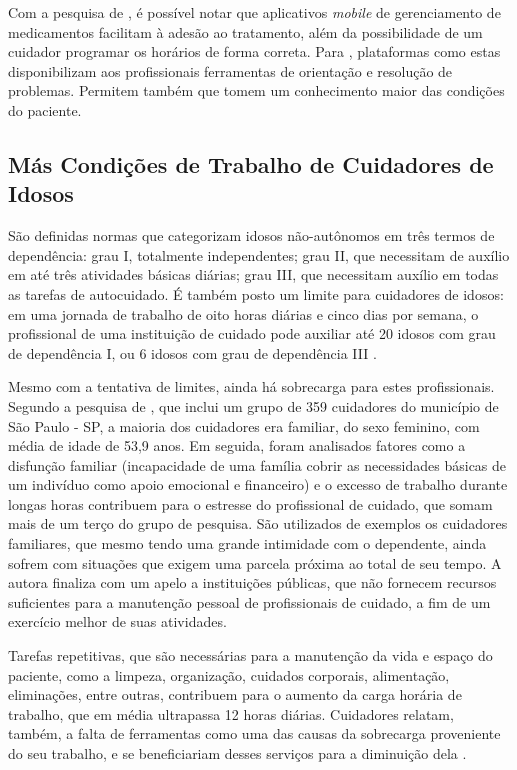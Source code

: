 \documentclass[
	article,			%
	12pt,				%
	oneside,			%
	a4paper,			%
    BIBLATEX,           %
	english,			%
	brazil,				%
	sumario=tradicional
	]{abntex2}
\begin{document}
Com a pesquisa de , é possível notar que aplicativos \textit{mobile} de gerenciamento de medicamentos facilitam à adesão ao tratamento, além da possibilidade de um cuidador programar os horários de forma correta. Para , plataformas como estas disponibilizam aos profissionais ferramentas de orientação e resolução de problemas. Permitem também que tomem um conhecimento maior das condições do paciente.

\subsection{Más Condições de Trabalho de Cuidadores de Idosos}

São definidas normas que categorizam idosos não-autônomos em três termos de dependência: grau I, totalmente independentes; grau II, que necessitam de auxílio em até três atividades básicas diárias; grau III, que necessitam auxílio em todas as tarefas de autocuidado. É também posto um limite para cuidadores de idosos: em uma jornada de trabalho de oito horas diárias e cinco dias por semana, o profissional de uma instituição de cuidado pode auxiliar até 20 idosos com grau de dependência I, ou 6 idosos com grau de dependência III \cite{ministeriosaude2021ilpi}.

Mesmo com a tentativa de limites, ainda há sobrecarga para estes profissionais. Segundo a pesquisa de \cite{nunes2018sabe}, que inclui um grupo de 359 cuidadores do município de São Paulo - SP, a maioria dos cuidadores era familiar, do sexo feminino, com média de idade de 53,9 anos. Em seguida, foram analisados fatores como a disfunção familiar (incapacidade de uma família cobrir as necessidades básicas de um indivíduo como apoio emocional e financeiro) e o excesso de trabalho durante longas horas contribuem para o estresse do profissional de cuidado, que somam mais de um terço do grupo de pesquisa. São utilizados de exemplos os cuidadores familiares, que mesmo tendo uma grande intimidade com o dependente, ainda sofrem com situações que exigem uma parcela próxima ao total de seu tempo. A autora finaliza com um apelo a instituições públicas, que não fornecem recursos suficientes para a manutenção pessoal de profissionais de cuidado, a fim de um exercício melhor de suas atividades.

Tarefas repetitivas, que são necessárias para a manutenção da vida e espaço do paciente, como a limpeza, organização, cuidados corporais, alimentação, eliminações, entre outras, contribuem para o aumento da carga horária de trabalho, que em média ultrapassa 12 horas diárias. Cuidadores relatam, também, a falta de ferramentas como uma das causas da sobrecarga proveniente do seu trabalho, e se beneficiariam desses serviços para a diminuição dela \cite{aline2012sobrecarga}.
\end{document}
